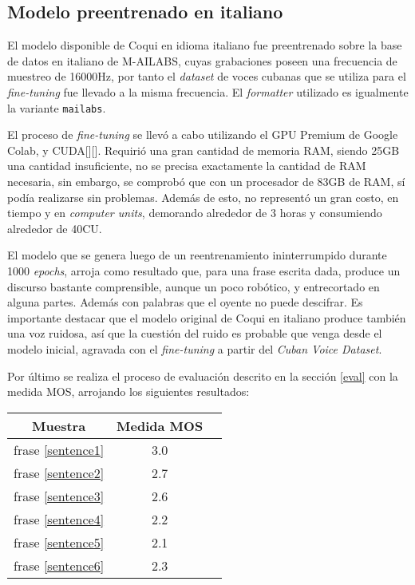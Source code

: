 \subsection{Modelo preentrenado en italiano}
El modelo disponible de Coqui en idioma italiano fue preentrenado sobre la base de datos en italiano de M-AILABS, cuyas grabaciones poseen una frecuencia de muestreo de 16000Hz, por tanto el \textit{dataset} de voces cubanas que se utiliza para el \textit{fine-tuning} fue llevado a la misma frecuencia.
El \textit{formatter} utilizado es igualmente la variante \texttt{mailabs}.

El proceso de \textit{fine-tuning} se llevó a cabo utilizando el GPU Premium de Google Colab, y CUDA[\cite{cuda}][\cite{cuda1}]. Requirió una gran cantidad de memoria RAM, siendo 25GB una cantidad insuficiente, no se precisa exactamente la cantidad de RAM necesaria, sin embargo, se comprobó que con un procesador de 83GB de RAM, sí podía realizarse sin problemas. Además de esto, no representó un gran costo, en tiempo y en \textit{computer units}, demorando alrededor de 3 horas y consumiendo alrededor de 40CU.

El modelo que se genera luego de un reentrenamiento ininterrumpido durante 1000 \textit{epochs}, arroja como resultado que, para una frase escrita dada, produce un discurso bastante comprensible, aunque un poco robótico, y entrecortado en alguna partes. Además con palabras que el oyente no puede descifrar. Es importante destacar que el modelo original de Coqui en italiano produce también una voz ruidosa, así que la cuestión del ruido es probable que venga desde el modelo inicial, agravada con el \textit{fine-tuning} a partir del \textit{Cuban Voice Dataset}.

Por último se realiza el proceso de evaluación descrito en la sección \ref{eval} con la medida MOS, arrojando los siguientes resultados:

\begin{center} \begin{tabular}{ |c|c|c| } 
		\hline 
		Muestra & Medida MOS \\
		\hline
		frase \ref{sentence1} & 3.0 \\
		frase \ref{sentence2} & 2.7 \\
		frase \ref{sentence3} & 2.6 \\
		frase \ref{sentence4} & 2.2 \\
		frase \ref{sentence5} & 2.1 \\
		frase \ref{sentence6} & 2.3 \\
		\hline 
	\end{tabular} 
\end{center}

